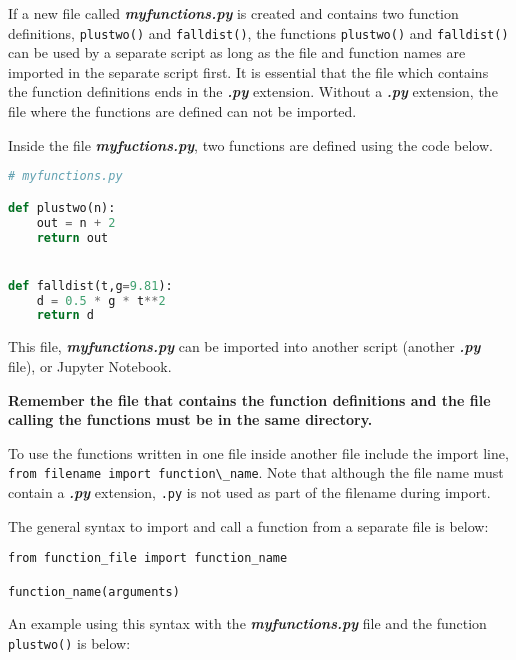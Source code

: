 \documentclass{book}
\newcommand{\passthrough}[1]{#1}
\begin{document}
If a new file called \textbf{\emph{myfunctions.py}} is created and
contains two function definitions, \passthrough{\lstinline!plustwo()!}
and \passthrough{\lstinline!falldist()!}, the functions
\passthrough{\lstinline!plustwo()!} and
\passthrough{\lstinline!falldist()!} can be used by a separate script as
long as the file and function names are imported in the separate script
first. It is essential that the file which contains the function
definitions ends in the \textbf{\emph{.py}} extension. Without a
\textbf{\emph{.py}} extension, the file where the functions are defined
can not be imported.
    




    
        Inside the file \textbf{\emph{myfuctions.py}}, two functions are defined
using the code below.

\begin{lstlisting}[language=Python]
# myfunctions.py

def plustwo(n):
    out = n + 2
    return out


def falldist(t,g=9.81):
    d = 0.5 * g * t**2
    return d
\end{lstlisting}
    




    
        This file, \textbf{\emph{myfunctions.py}} can be imported into another
script (another \textbf{\emph{.py}} file), or Jupyter Notebook.

\textbf{Remember the file that contains the function definitions and the
file calling the functions must be in the same directory.}

To use the functions written in one file inside another file include the
import line,
\passthrough{\lstinline!from filename import function\_name!}. Note that
although the file name must contain a \textbf{\emph{.py}} extension,
\passthrough{\lstinline!.py!} is not used as part of the filename during
import.

The general syntax to import and call a function from a separate file is
below:

\begin{lstlisting}
from function_file import function_name

function_name(arguments)
\end{lstlisting}

An example using this syntax with the \textbf{\emph{myfunctions.py}}
file and the function \passthrough{\lstinline!plustwo()!} is below:
    
\end{document}
